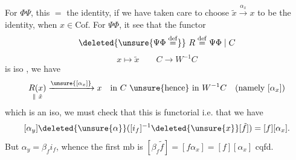 For $\Phi\Psi$, this $=$ the identity, if we have taken care to choose $\tilde x\xrightarrow{\alpha_x}x$ to be the identity, when $x\in\mathrm{Cof}$.
For $\Psi\Phi$, it   see that the functor
\[
\deleted{\unsure{\Psi\Phi\overset{\mathrm{def}}{=}}}\ R\overset{\mathrm{def}}{=}\Psi\Phi\mid C
\]
\[
x\longmapsto\tilde x\qquad C\longrightarrow W^{-1}C
\]
is iso  , we have
\[
\underset{\parallel\ \tilde x}{R(x)}\xrightarrow{\unsure{[\alpha_x]}}x\quad\text{in }C\ \unsure{\text{hence}}\ \text{in }W^{-1}C\quad(\text{namely }[\alpha_x])
\]
which is an iso, we must check that this is functorial
i.e. that we have
\[
[\alpha_y]\deleted{\unsure{\alpha}}([i_f]^{-1}\deleted{\unsure{x}}[\tilde f])=[f][\alpha_x].
\]
But $\alpha_y=\beta_f i_f$, whence the first mb is $[\beta_f\tilde f]=[f\alpha_x]=[f][\alpha_x]$ cqfd.

